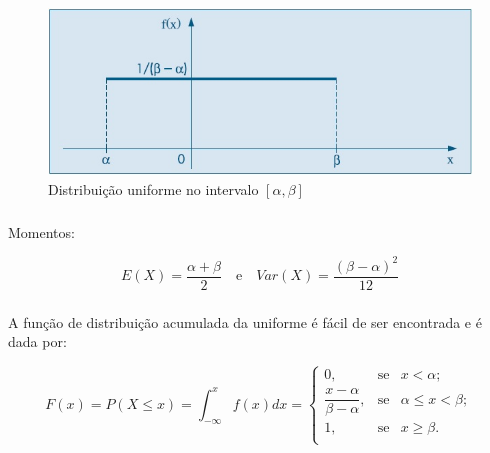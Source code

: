\documentclass[14pt,aspectratio=1610]{beamer}
\begin{document}
\begin{frame}{}
\frametitle{}
\begin{block}{}
\justifying
\begin{figure}[H]
    \centering
    \includegraphics[scale=0.5]{figs/uniform}
    \caption{Distribuição uniforme no intervalo $[\alpha,\beta]$}
  \end{figure}
\end{block}
\end{frame}

\begin{frame}{}
\frametitle{}
\begin{block}{Momentos:}
\justifying

$$E(X)=\dfrac{\alpha+\beta}{2}\quad \textrm{e}\quad Var(X)=\dfrac{(\beta-\alpha)^{2}}{12}$$

\end{block}
\end{frame}

\begin{frame}{}
\frametitle{}
\begin{block}{}
\justifying
A função de distribuição acumulada da uniforme é fácil de ser encontrada e é dada por:

$$
F(x)=P(X\leq x)={\displaystyle \int_{-\infty}^{x}f(x)dx}=\left\{
\begin{array}{ccccc}
0,           & \textrm{se} & x<\alpha     ;\\
\dfrac{x-\alpha}{\beta-\alpha},& \textrm{se} & \alpha\leq x< \beta;\\
1,           & \textrm{se} & x\geq \beta .\\
\end{array}
\right.
$$
\end{block}
\end{frame}
\end{document}
